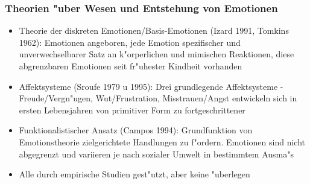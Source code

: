 \subsubsection{Theorien "uber Wesen und Entstehung von Emotionen}
\begin{itemize}
	\item
		Theorie der diskreten Emotionen/Basis-Emotionen (Izard 1991, Tomkins 1962): Emotionen angeboren, jede Emotion spezifischer und unverwechselbarer Satz an k"orperlichen und mimischen Reaktionen, diese abgrenzbaren Emotionen seit fr"uhester Kindheit vorhanden
	\item
		Affektsysteme (Sroufe 1979 u 1995): Drei grundlegende Affektsysteme - Freude/Vergn"ugen, Wut/Frustration, Misstrauen/Angst entwickeln sich in ersten Lebensjahren von primitiver Form zu fortgeschrittener
	\item
		Funktionalistischer Ansatz (Campos 1994): Grundfunktion von Emotionstheorie zielgerichtete Handlungen zu f"ordern. Emotionen sind nicht abgegrenzt und variieren je nach sozialer Umwelt in bestimmtem Ausma"s
	\item
		Alle durch empirische Studien gest"utzt, aber keine "uberlegen
\end{itemize}

